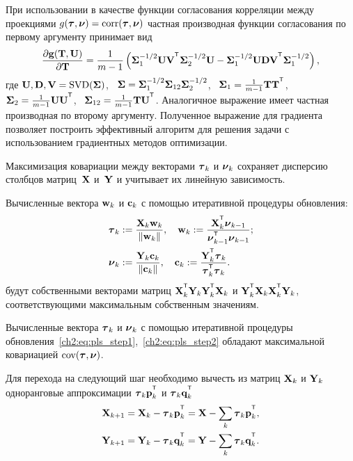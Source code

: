\documentclass[11pt, a5paper]{dissert}
\begin{document}
При использовании в качестве функции согласования корреляции между проекциями $g(\boldsymbol{\tau}, \boldsymbol{\nu}) = \textnormal{corr}(\boldsymbol{\tau}, \boldsymbol{\nu})$ частная производная функции согласования по первому аргументу принимает вид
\[
	\frac{\partial \mathbf{g}(\bT, \bU)}{\partial \bT} = \frac{1}{m - 1} \left(\bSigma_1^{-1/2} \bU \bV^{\T} \bSigma_2^{-1/2} \bU - \bSigma_1^{-1/2} \bU \bD \bV^{\T} \bSigma_1^{-1/2} \right),
\]
где $\mathbf{U}, \mathbf{D}, \mathbf{V} = \textnormal{SVD}(\boldsymbol{\Sigma})$, \, $\boldsymbol{\Sigma} = \boldsymbol{\Sigma}_1^{-1/2} \boldsymbol{\Sigma}_{12} \boldsymbol{\Sigma}_2^{-1/2} $, \, $\bSigma_1 = \frac{1}{m - 1} \bT \bT^{\T}$, \, $\bSigma_2 = \frac{1}{m - 1} \bU \bU^{\T}$, \, $\bSigma_{12} = \frac{1}{m - 1} \bT \bU^{\T}$.
Аналогичное выражение имеет частная производная по второму аргументу.
Полученное выражение для градиента позволяет построить эффективный алгоритм для решения задачи с использованием градиентных методов оптимизации.
\begin{statement}
	Максимизация ковариации между векторами $\boldsymbol{\tau}_k$ и $\boldsymbol{\nu}_k$ сохраняет дисперсию столбцов матриц~$\mathbf{X}$ и~$\mathbf{Y}$ и учитывает их линейную зависимость.
\end{statement}

\begin{statement}
	Вычисленные вектора $\mathbf{w}_k$ и $\mathbf{c}_k$ с помощью итеративной процедуры обновления:
	\begin{align}
		\btau_k &:= \frac{\bX_k \bw_k}{\|\bw_k\|}, \quad  \bw_k := \frac{\bX_k^{\T} \bnu_{k-1}}{\bnu_{k-1}^{\T} \bnu_{k-1}}; \label{ch2:eq:pls_step1}\\ 
		\bnu_k &:= \frac{\bY_k \bc_k}{\| \bc_k \|}, \quad \bc_k := \frac{\bY_k^{\T} \btau_k}{\btau_k^{\T} \btau_k}. \label{ch2:eq:pls_step2}
	\end{align}
	будут собственными векторами матриц $\bX_k^{\T} \bY_k \bY_k^{\T} \bX_k$ и $\bY_k^{\T} \bX_k \bX_k^{\T} \bY_k$, соответствующими максимальным собственным значениям.
\end{statement}

\begin{statement}
		Вычисленные вектора $\boldsymbol{\tau}_k$ и $\boldsymbol{\nu}_k$ с помощью итеративной процедуры обновления~\eqref{ch2:eq:pls_step1},~\eqref{ch2:eq:pls_step2} обладают максимальной ковариацией $\textnormal{cov}(\boldsymbol{\tau}, \boldsymbol{\nu})$.
\end{statement}

Для перехода на следующий шаг необходимо вычесть из матриц $\mathbf{X}_k$ и $\mathbf{Y}_k$ одноранговые аппроксимации $\btau_k \bp_k^{\T}$ и $\btau_k \bq_k^{\T}$
\begin{align*}
	\bX_{k + 1} &= \bX_{k} - \btau_k \bp_k^{\T} = \bX - \sum_k \btau_k \bp_k^{\T}, \\
	\bY_{k + 1} &= \bY_{k} - \btau_k \bq_k^{\T} = \bY - \sum_k \btau_k \bq_k^{\T}.
\end{align*}
\end{document}
